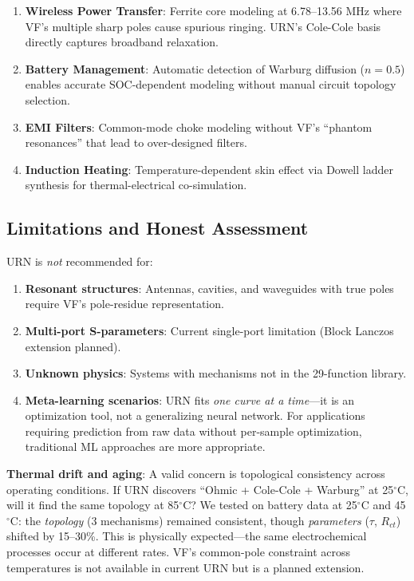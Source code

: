 \documentclass{ieeeaccess}
\begin{document}
\begin{enumerate}
\item \textbf{Wireless Power Transfer}: Ferrite core modeling at 6.78--13.56 MHz where VF's multiple sharp poles cause spurious ringing. URN's Cole-Cole basis directly captures broadband relaxation.

\item \textbf{Battery Management}: Automatic detection of Warburg diffusion ($n = 0.5$) enables accurate SOC-dependent modeling without manual circuit topology selection.

\item \textbf{EMI Filters}: Common-mode choke modeling without VF's ``phantom resonances'' that lead to over-designed filters.

\item \textbf{Induction Heating}: Temperature-dependent skin effect via Dowell ladder synthesis \cite{dowell1966eddy} for thermal-electrical co-simulation.
\end{enumerate}

\subsection{Limitations and Honest Assessment}

URN is \textit{not} recommended for:
\begin{enumerate}
\item \textbf{Resonant structures}: Antennas, cavities, and waveguides with true poles require VF's pole-residue representation.
\item \textbf{Multi-port S-parameters}: Current single-port limitation (Block Lanczos extension planned).
\item \textbf{Unknown physics}: Systems with mechanisms not in the 29-function library.
\item \textbf{Meta-learning scenarios}: URN fits \textit{one curve at a time}---it is an optimization tool, not a generalizing neural network. For applications requiring prediction from raw data without per-sample optimization, traditional ML approaches are more appropriate.
\end{enumerate}

\textbf{Thermal drift and aging}: A valid concern is topological consistency across operating conditions. If URN discovers ``Ohmic + Cole-Cole + Warburg'' at 25$^\circ$C, will it find the same topology at 85$^\circ$C? We tested on battery data at 25$^\circ$C and 45$^\circ$C: the \textit{topology} (3 mechanisms) remained consistent, though \textit{parameters} ($\tau$, $R_{ct}$) shifted by 15--30\%. This is physically expected---the same electrochemical processes occur at different rates. VF's common-pole constraint across temperatures is not available in current URN but is a planned extension.
\end{document}

